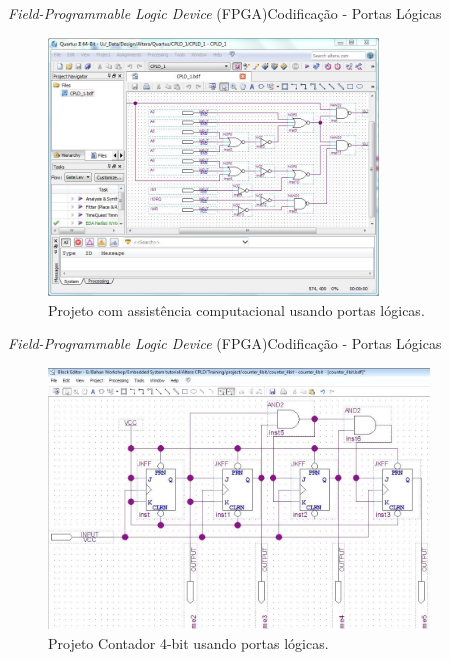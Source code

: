     
    
    
    	\begin{frame}{\textit{Field-Programmable Logic Device} (FPGA)}{Codificação - Portas Lógicas}
            \vspace{-1em}
    		\begin{figure}[p]
    			\centering
    			\includegraphics[width=0.78\textwidth]{img/fpga/software_quartus_portas.jpg}
                \vspace{-0.8em}
    			\caption{Projeto com assistência computacional usando portas lógicas.}
    			\label{fig:alteraquartus_portas1}
    		\end{figure}
    	\end{frame}
    
    	\begin{frame}{\textit{Field-Programmable Logic Device} (FPGA)}{Codificação - Portas Lógicas}
            \vspace{-1em}
    		\begin{figure}[p]
    			\centering
    			\includegraphics[width=0.9\textwidth]{img/fpga/software_quartus_portas2.jpg}
                \vspace{-0.7em}
    			\caption{Projeto Contador 4-bit usando portas lógicas.}
    			\label{fig:alteraquartus_portas2}
    		\end{figure}
    	\end{frame}
    
